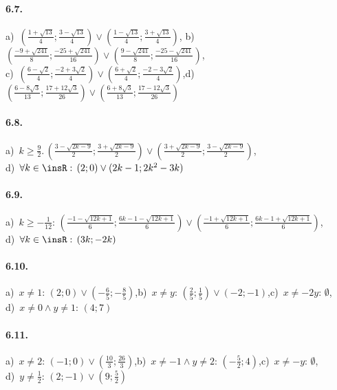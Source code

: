 \paragraph{6.7.} a)~$\left(\frac{1+\sqrt{13}} 4;\frac{3-\sqrt{13}} 4\right)\vee \left(\frac{1-\sqrt{13}} 4;\frac{3+\sqrt{13}} 4\right)$,\; b)~$\left(\frac{-9+\sqrt{241}} 8;\frac{-25+\sqrt{241}}{16}\right)\vee \left(\frac{9-\sqrt{241}} 8;\frac{-25-\sqrt{241}}{16}\right)$,\protect\\
c)~$\left(\frac{6-\sqrt 2} 4;\frac{-2+3\sqrt 2} 4\right)\vee \left(\frac{6+\sqrt 2} 4;\frac{-2-3\sqrt 2} 4\right)$,\quad d)~$\left(\frac{6-8\sqrt 3}{13};\frac{17+12\sqrt 3}{26}\right)\vee\left(\frac{6+ 8\sqrt 3}{13};\frac{17-12\sqrt 3}{26}\right)$

\paragraph{6.8.} a)~$k\ge \frac 9 2.\, \left(\frac{3-\sqrt{2k-9}} 2; \frac{3+\sqrt{2k-9}} 2\right)\vee \left(\frac{3+\sqrt{2k-9}} 2; \frac{3-\sqrt{2k-9}} 2\right)$,\protect\\
\quad d)~$\forall k\in \insR:\, (2; 0)\vee (2k-1; 2k^2-3k)$

\paragraph{6.9.} a)~$k\ge -\frac 1{12}:\, \left(\frac{-1-\sqrt{12k+1}} 6; \frac{6k-1-\sqrt{12k+1}} 6\right) \vee \left(\frac{-1+\sqrt{12k+1}} 6; \frac{6k-1+\sqrt{12k+1}} 6\right)$,\protect\\
\quad d)~$\forall k\in \insR:\, (3k; -2k)$

\paragraph{6.10.} a)~$x\neq 1:\, \left(2;0\right)\vee \left(-\frac 6 5;-\frac 8 5\right)$,\quad b)~$x\neq y:\, \left(\frac 2 5;\frac 1 5\right)\vee \left(-2;-1\right)$,\quad c)~$x\neq -2y:\, \emptyset $,\protect\\
\quad d)~$x\neq 0\wedge y\neq 1:\, (4;7)$

\paragraph{6.11.} a)~$x\neq 2:\, \left(-1;0\right)\vee \left(\frac{10} 3;\frac{26} 3\right)$,\quad b)~$x\neq -1\wedge y\neq 2:\, \left(-\frac 5 2;4\right)$,\quad c)~$x\neq -y:\, \emptyset $,\protect\\
\quad d)~$y\neq \frac 1 2:\, \left(2;-1\right)\vee \left(9;\frac 5 2\right)$

